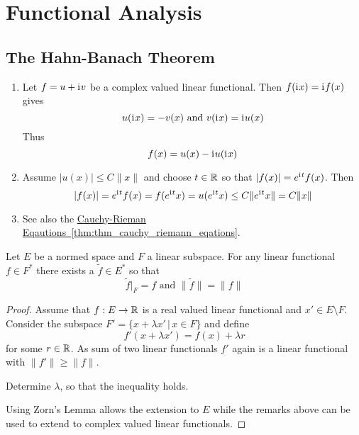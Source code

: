 \newpage
\section{Functional Analysis}

\subsection{The Hahn-Banach Theorem}
\bigskip

\begin{remarks}
    \hfill
    \begin{enumerate}
        \item Let \( f = u + \mathrm{i}\mkern1mu v\) be a complex valued linear functional.
              Then \( f(\mathrm{i}\mkern1mu x) = \mathrm{i}\mkern1mu f(x) \) gives
              \[
                  u(\mathrm{i}\mkern1mu x) = -v(x) \text{ and } v(\mathrm{i}\mkern1mu x) = \mathrm{i}\mkern1mu u(x)
              \]
              Thus
              \[
                  f(x) = u(x) - \mathrm{i}\mkern1mu u(\mathrm{i}\mkern1mu x)
              \]
        \item Assume \( |u(x)| \le C\|x\| \) and choose \( t \in \mathbb{R} \) so that \( |f(x)| = e^{\mathrm{i}\mkern1mu t}f(x) \).
              Then
              \[
                  |f(x)| = e^{\mathrm{i}\mkern1mu t}f(x) = f(e^{\mathrm{i}\mkern1mu t}x) = u(e^{\mathrm{i}\mkern1mu t}x) \le C\|e^{\mathrm{i}\mkern1mu t}x\| = C\|x\|
              \]
        \item
              See also the \hyperref[thm:thm_cauchy_riemann_eqations]{Cauchy-Rieman 
              Eqautions~\ref*{thm:thm_cauchy_riemann_eqations}}.
    \end{enumerate}
\end{remarks}
\bigskip


\begin{theorem}\label{thm:hahn_banach}
    Let \( E \) be a normed space and \( F \) a linear subspace. For any linear functional
    \( f \in F^* \) there exists a \( \tilde{f} \in E^* \) so that
    \[
        \tilde{f}|_F = f \text{ and } \|\tilde{f}\| = \|f\|
    \]
\end{theorem}

\begin{proof}
    Assume that \( f: E \to \mathbb{R} \) is a real valued linear functional and \( x' \in E \setminus F \).
    Consider the subspace \( F' = \{x + \lambda x' \,|\, x \in F \} \) and define
    \[
        f'(x + \lambda x') = f(x) + \lambda r
    \]
    for some \( r \in \mathbb{R} \).  As sum of two linear functionals \( f' \) again is a linear functional with
    \( \|f'\| \ge \|f\| \).

    Determine \( \lambda \), so that the inequality holds.

    Using Zorn's Lemma allows the extension to \( E \) while the remarks above can be used to extend
    to complex valued linear functionals.
\end{proof}
\bigskip


